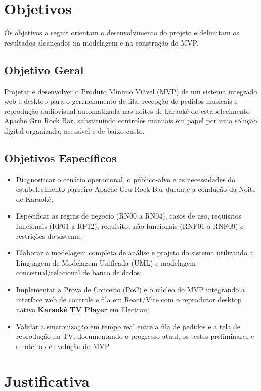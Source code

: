 \section{Objetivos}

Os objetivos a seguir orientam o desenvolvimento do projeto e delimitam os resultados alcançados na modelagem e na construção do MVP.

\subsection{Objetivo Geral}

Projetar e desenvolver o Produto Mínimo Viável (MVP) de um sistema integrado web e desktop para o gerenciamento de fila, recepção de pedidos musicais e reprodução audiovisual automatizada nas noites de karaokê do estabelecimento Apache Gru Rock Bar, substituindo controles manuais em papel por uma solução digital organizada, acessível e de baixo custo.

\subsection{Objetivos Específicos} \label{sec:objetivos_especificos}

\begin{itemize}
  \item Diagnosticar o cenário operacional, o público-alvo e as necessidades do estabelecimento parceiro Apache Gru Rock Bar durante a condução da Noite de Karaokê;
  \item Especificar as regras de negócio (RN00 a RN04), casos de uso, requisitos funcionais (RF01 a RF12), requisitos não funcionais (RNF01 a RNF09) e restrições do sistema;
  \item Elaborar a modelagem completa de análise e projeto do sistema utilizando a Linguagem de Modelagem Unificada (UML) e modelagem conceitual/relacional de banco de dados;
  \item Implementar a Prova de Conceito (PoC) e o núcleo do MVP integrando a interface web de controle e fila em React/Vite com o reprodutor desktop nativo \textbf{Karaokê TV Player} em Electron;
  \item Validar a sincronização em tempo real entre a fila de pedidos e a tela de reprodução na TV, documentando o progresso atual, os testes preliminares e o roteiro de evolução do MVP.
\end{itemize}

\section{Justificativa}

